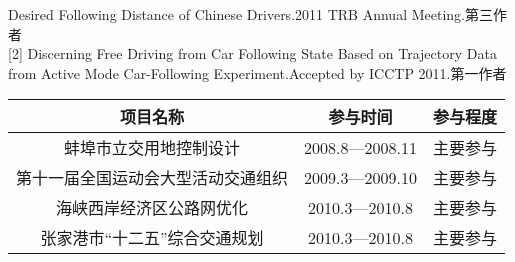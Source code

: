 \begin{flushleft}
\end{flushleft}

\song
[1] Desired Following Distance of Chinese Drivers.2011 TRB Annual Meeting.第三作者\\

[2] Discerning Free Driving from Car Following State Based on Trajectory Data from Active Mode Car-Following Experiment.Accepted by ICCTP 2011.第一作者\\
\vspace{30mm}
\begin{flushleft}
\end{flushleft}


\song
\begin{table}[h]
  \centering
    \begin{tabular}{ccc}
    \addlinespace
    \toprule
    项目名称  & 参与时间  & 参与程度 \\
    \midrule
    蚌埠市立交用地控制设计 & 2008.8—2008.11 & 主要参与 \\
    第十一届全国运动会大型活动交通组织 & 2009.3—2009.10 & 主要参与 \\
    海峡西岸经济区公路网优化 & 2010.3—2010.8 & 主要参与 \\
    张家港市“十二五”综合交通规划 & 2010.3—2010.8 & 主要参与 \\
    \bottomrule
    \end{tabular}%
\end{table}%
